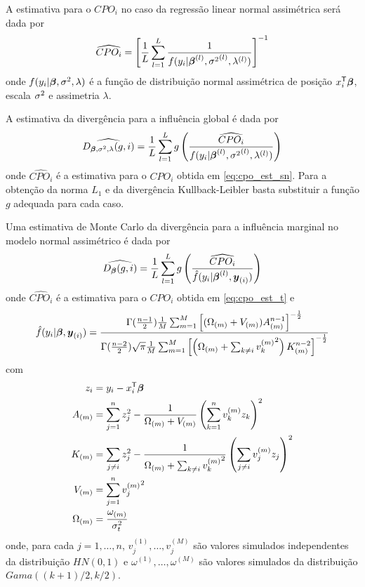 A estimativa para o $CPO_i$ no caso da regressão linear normal assimétrica será dada por
\begin{equation}\label{eq:cpo_est_sn}
\widehat{CPO_i} = \left[\frac{1}{L}\sum_{l=1}^L\frac{1}{f(y_i|{\boldsymbol{\beta}}^{(l)},{\sigma^2}^{(l)},\lambda^{(l)})}\right]^{-1}
\end{equation}
onde $f(y_i|{\boldsymbol{\beta}},\sigma^2,\lambda)$ é a função de distribuição normal assimétrica de posição $x_i^{\mathsf{T}}{\boldsymbol{\beta}}$, escala $\sigma^2$ e assimetria $\lambda$.

A estimativa da divergência para a influência global é dada por
\begin{equation}
\widehat{D_{{\boldsymbol{\beta}},\sigma^2,\lambda}(g,i)} = \frac{1}{L}\sum_{l=1}^L g\left(\frac{\widehat{CPO_i}}{f(y_i|{\boldsymbol{\beta}}^{(l)},{\sigma^2}^{(l)},\lambda^{(l)})}\right)
\end{equation}
onde $\widehat{CPO_i}$ é a estimativa para o $CPO_i$ obtida em \eqref{eq:cpo_est_sn}. Para a obtenção da norma $L_1$ e da divergência Kullback-Leibler basta substituir a função $g$ adequada para cada caso.

\begin{prop}
Uma estimativa de Monte Carlo da divergência para a influência marginal no modelo normal assimétrico é dada por
\begin{equation}
\widehat{D_{\boldsymbol{\beta}}(g,i)} = \frac{1}{L}\sum_{l=1}^L g\left(\frac{\widehat{CPO_i}}{\hat{f}(y_i|{\boldsymbol{\beta}}^{(l)},{\boldsymbol{y}_{(i)}})}\right)
\end{equation}
onde $\widehat{CPO_i}$ é a estimativa para o $CPO_i$ obtida em \eqref{eq:cpo_est_t} e 
\begin{equation}
\begin{split}
\hat{f}(y_i|{\boldsymbol{\beta}},{\boldsymbol{y}_{(i)}}) =
\frac{\Gamma(\frac{n-1}{2})\frac{1}{M}\sum_{m=1}^M\left[(\Omega_{(m)}+V_{(m)}) A_{(m)}^{n-1}\right]^{-\frac{1}{2}}}
{\Gamma(\frac{n-2}{2})\sqrt{\pi}\frac{1}{M}\sum_{m=1}^M \left[ \left(\Omega_{(m)} + \sum_{k \neq i}{v_k^{(m)}}^2\right) K_{(m)}^{n-2}\right]^{-\frac{1}{2}}}
\end{split}
\end{equation}
com
\begin{equation}
\begin{split}
z_i & = y_i - x_i^{\mathsf{T}}{\boldsymbol{\beta}} \\
A_{(m)} & = \sum_{j=1}^nz_j^2 - \frac{1}{\Omega_{(m)} + V_{(m)}}\left(\sum_{k=1}^nv_k^{(m)}z_k\right)^2 \\
K_{(m)} & = \sum_{j\neq i}z_j^2-\frac{1}{\Omega_{(m)}+\sum_{k \neq i}{v_k^{(m)}}^2}\left(\sum_{j\neq i}v_j^{(m)}z_j\right)^2 \\
V_{(m)} & = \sum_{j=1}^n {v_j^{(m)}}^2 \\
\Omega_{(m)} & = \frac{\omega_{(m)}}{\sigma^2_t}
\end{split}
\end{equation}
onde, para cada $j=1,\ldots,n$, $v_j^{(1)},\ldots,v_j^{(M)}$ são valores simulados independentes da distribuição $HN(0,1)$ e $\omega^{(1)},\ldots,\omega^{(M)}$ são valores simulados da distribuição $Gama((k+1)/2,k/2)$.
\end{prop}

